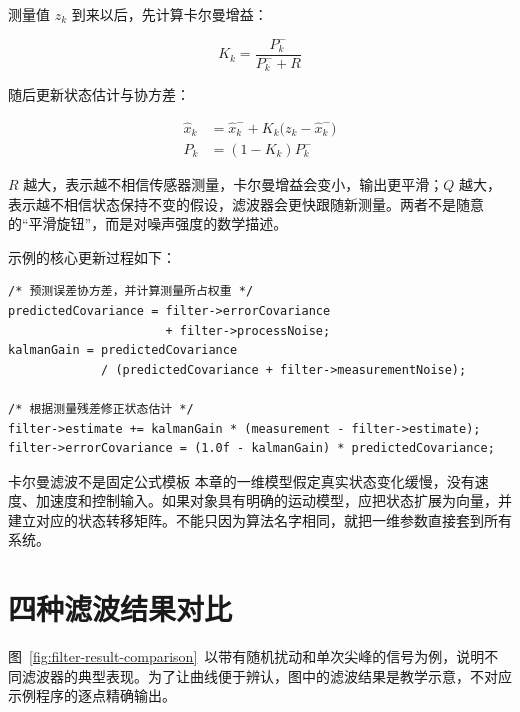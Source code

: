 测量值 $z_k$ 到来以后，先计算卡尔曼增益：

\begin{equation}
K_k=\frac{P_k^{-}}{P_k^{-}+R}
\label{eq:kalman-gain}
\end{equation}

随后更新状态估计与协方差：

\begin{align}
\hat{x}_k &= \hat{x}_k^{-}+K_k\bigl(z_k-\hat{x}_k^{-}\bigr) \\
P_k &= (1-K_k)P_k^{-}
\label{eq:kalman-correct}
\end{align}

$R$ 越大，表示越不相信传感器测量，卡尔曼增益会变小，输出更平滑；$Q$ 越大，表示越不相信状态保持不变的假设，滤波器会更快跟随新测量。两者不是随意的“平滑旋钮”，而是对噪声强度的数学描述。

示例的核心更新过程如下：

\begin{lstlisting}[style=c]
/* 预测误差协方差，并计算测量所占权重 */
predictedCovariance = filter->errorCovariance
                      + filter->processNoise;
kalmanGain = predictedCovariance
             / (predictedCovariance + filter->measurementNoise);

/* 根据测量残差修正状态估计 */
filter->estimate += kalmanGain * (measurement - filter->estimate);
filter->errorCovariance = (1.0f - kalmanGain) * predictedCovariance;
\end{lstlisting}

\begin{anybox}{卡尔曼滤波不是固定公式模板}
本章的一维模型假定真实状态变化缓慢，没有速度、加速度和控制输入。如果对象具有明确的运动模型，应把状态扩展为向量，并建立对应的状态转移矩阵。不能只因为算法名字相同，就把一维参数直接套到所有系统。
\end{anybox}

\section{四种滤波结果对比}

图~\ref{fig:filter-result-comparison}~以带有随机扰动和单次尖峰的信号为例，说明不同滤波器的典型表现。为了让曲线便于辨认，图中的滤波结果是教学示意，不对应示例程序的逐点精确输出。

